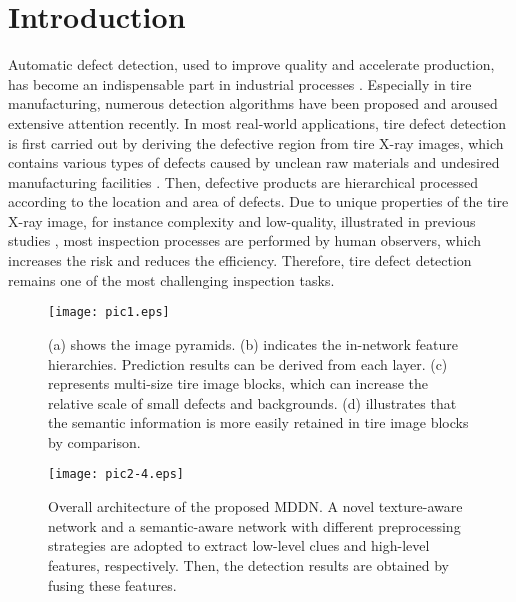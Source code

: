 \documentclass{article}
\begin{document}
\section{Introduction}
\label{sec:intro}
Automatic defect detection, used to improve quality and accelerate production, has become an indispensable part in industrial processes \cite{kumar2008computer,li2016deformable}. Especially in tire manufacturing, numerous detection algorithms have been proposed \cite{zhang2013texture,zhang2018tire,xiang2014dictionary} and aroused extensive attention recently. In most real-world applications, tire defect detection is first carried out by deriving the defective region from tire X-ray images, which contains various types of defects caused by unclean raw materials and undesired manufacturing facilities \cite{guo2016defect}. Then, defective products are hierarchical processed according to the location and area of defects. Due to unique properties of the tire X-ray image, for instance complexity and low-quality, illustrated in previous studies \cite{zhang2013defect,wang2019tire}, most inspection processes are performed by human observers, which increases the risk and reduces the efficiency. Therefore, tire defect detection remains one of the most challenging inspection tasks.
\begin{figure}[t]
  \centering
  \centerline{\texttt{[image: pic1.eps]}}
  \caption{(a) shows the image pyramids. (b) indicates the in-network feature hierarchies. Prediction results can be derived from each layer. (c) represents multi-size tire image blocks, which can increase the relative scale of small defects and backgrounds. (d) illustrates that the semantic information is more easily retained in tire image blocks by comparison.}
  \label{fig1}
\end{figure}
\begin{figure*}[t]
  \centering
  \centerline{\texttt{[image: pic2-4.eps]}}
  \caption{Overall architecture of the proposed MDDN. A novel texture-aware network and a semantic-aware network with different preprocessing strategies are adopted to extract low-level clues and high-level features, respectively. Then, the detection results are obtained by fusing these features.}
  \label{fig2}
\end{figure*}
\end{document}
